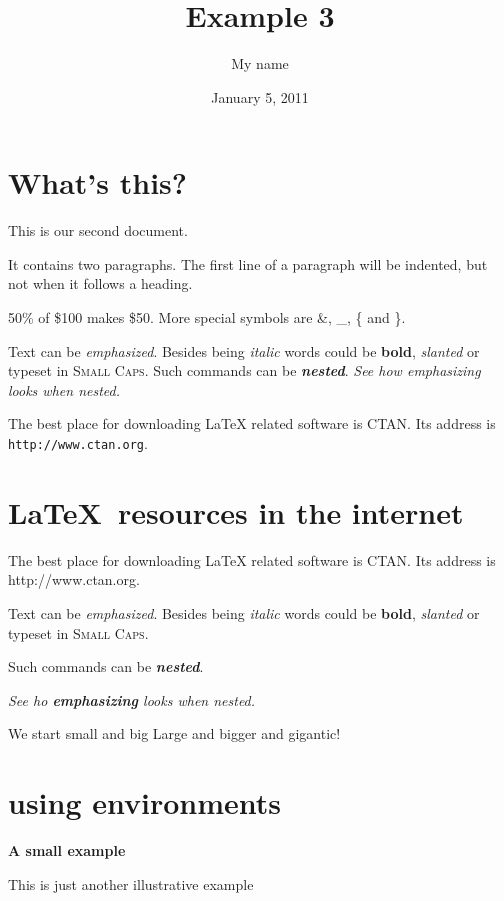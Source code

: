 \documentclass[letterpaper,11pt]{article}
\begin{document}
\title{Example 3}
\author{My name}
\date{January 5, 2011}
\maketitle
\section{What's this?}
This is our
second document.

It contains two paragraphs. The first line of a paragraph will be
indented, but not when it follows a heading.


50\% of \$100 makes \$50.
More special symbols are \&, \_, \{ and \}.





Text can be \emph{emphasized}.
Besides being \textit{italic} words could be \textbf{bold},
\textsl{slanted} or typeset in \textsc{Small Caps}.
Such commands can be \textit{\textbf{nested}}.
\emph{See how \emph{emphasizing} looks when nested.}



The best place for downloading LaTeX related software is CTAN.
Its address is \texttt{http://www.ctan.org}.





\section{\sffamily\LaTeX\ resources in the internet}
The best place for downloading LaTeX related software is CTAN.
Its address is \ttfamily http://www.ctan.org\rmfamily.


{\sffamily Text can be {\em emphasized}.  Besides being {\itshape italic} words could be {\bfseries bold}, {\slshape slanted} or typeset in {\scshape Small Caps}.  

Such commands can be {\itshape\bfseries nested}.}

{\em See ho {\em \bfseries emphasizing} looks when nested.}


\noindent \tiny We \scriptsize start \footnotesize \small small \normalsize and \large big \Large Large  \LARGE and bigger \huge and \Huge gigantic!


\normalsize


\section{using environments}
\begin{huge}
\bfseries %
A small example

\end{huge}
\bigskip
This is just another illustrative example
\end{document}
